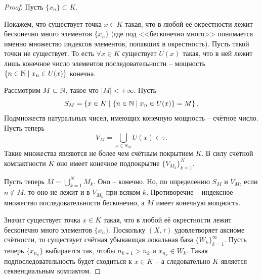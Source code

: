 \begin{proof}
    Пусть $\{x_n\} \subset K$.

    Покажем, что существует точка $x \in K$ такая, что в любой её окрестности лежит бесконечно много элементов $\{x_n\}$ (где под <<бесконечно много>> понимается именно множество индексов элементов, попавших в окрестность).
    Пусть такой точки не существует.
    То есть $\forall x \in K$ существует $U(x)$ такая, что в ней лежит лишь конечное число элементов последовательности -- мощность $\{n \in \mathbb{N} \mid x_n \in U(x)\}$ конечна.

    Рассмотрим $M \subset \mathbb{N}$, такое что $|M| < +\infty$.
    Пусть
    \[
        S_M = \left\{x \in K \mid \{n \in \mathbb{N} \mid x_n \in U(x)\} = M \right\}.
    \]
    Подмножеств натуральных чисел, имеющих конечную мощность -- счётное число.
    Пусть теперь
    \[
        V_M = \bigcup_{x \in S_M} U(x) \in \tau.
    \]
    Такие множества являются не более чем счётным покрытием $K$.
    В силу счётной компактности $K$ оно имеет конечное подпокрытие $\{V_{M_k}\}_{k = 1}^{N}$.

    Пусть теперь $M = \bigcup_{k = 1}^{N} M_k$.
    Оно -- конечно.
    Но, по определению $S_M$ и $V_M$, если $n \notin M$, то оно не лежит и в $V_{M_k}$ при всяком $k$.
    Противоречие -- индексное множество последовательности бесконечно, а $M$ имеет конечную мощность.

    Значит существует точка $x \in K$ такая, что в любой её окрестности лежит бесконечно много элементов $\{x_n\}$.
    Поскольку $(X, \tau)$ удовлетворяет аксиоме счётности, то существует счётная убывающая локальная база $\{W_k\}_{k = 1}^{\infty}$.
    Пусть теперь $\{x_{n_k}\}$ выбирается так, чтобы $n_{k + 1} > n_{k}$ и $x_{n_k} \in W_k$.
    Такая подпоследовательность будет сходиться к $x \in K$ -- а следовательно $K$ является секвенциальным компактом.
\end{proof}

